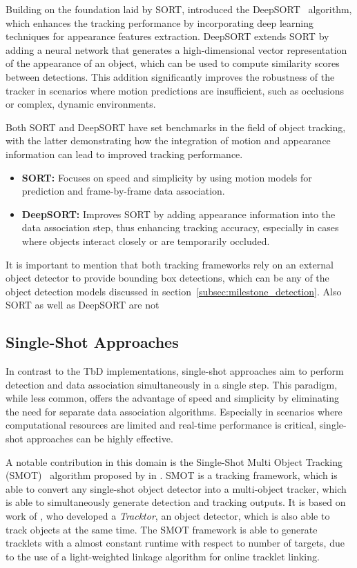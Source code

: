 Building on the foundation laid by SORT, \citeauthor{Wojke17} introduced the DeepSORT~\cite{Wojke17} algorithm, which enhances the tracking performance by incorporating deep learning techniques for appearance features extraction. DeepSORT extends SORT by adding a neural network that generates a high-dimensional vector representation of the appearance of an object, which can be used to compute similarity scores between detections. This addition significantly improves the robustness of the tracker in scenarios where motion predictions are insufficient, such as occlusions or complex, dynamic environments.

Both SORT and DeepSORT have set benchmarks in the field of object tracking, with the latter demonstrating how the integration of motion and appearance information can lead to improved tracking performance.

\begin{itemize}
    \item \textbf{SORT:} Focuses on speed and simplicity by using motion models for prediction and frame-by-frame data association.
    \item \textbf{DeepSORT:} Improves SORT by adding appearance information into the data association step, thus enhancing tracking accuracy, especially in cases where objects interact closely or are temporarily occluded.
\end{itemize}

It is important to mention that both tracking frameworks rely on an external object detector to provide bounding box detections, which can be any of the object detection models discussed in section~\ref{subsec:milestone_detection}. Also SORT as well as DeepSORT are not

\subsection{Single-Shot Approaches}\label{subsec:single-shot_approaches}
In contrast to the TbD implementations, single-shot approaches aim to perform detection and data association simultaneously in a single step. This paradigm, while less common, offers the advantage of speed and simplicity by eliminating the need for separate data association algorithms. Especially in scenarios where computational resources are limited and real-time performance is critical, single-shot approaches can be highly effective.

A notable contribution in this domain is the Single-Shot Multi Object Tracking (SMOT)~\cite{Li20} algorithm proposed by \citeauthor{Li20} in \citeyear{Li20}. SMOT is a tracking framework, which is able to convert any single-shot object detector into a multi-object tracker, which is able to simultaneously generate detection and tracking outputs. It is based on work of \textcite{Bergmann19}, who developed a \textit{Tracktor}, an object detector, which is also able to track objects at the same time. The SMOT framework is able to generate tracklets with a almost constant runtime with respect to number of targets, due to the use of a light-weighted linkage algorithm for online tracklet linking.

